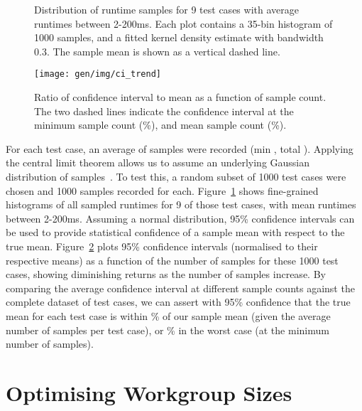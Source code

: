 \begin{figure}

\caption{%
  Distribution of runtime samples for 9 test cases with average
  runtimes between 2-200ms. Each plot contains a 35-bin histogram of
  1000 samples, and a fitted kernel density estimate with bandwidth
  0.3. The sample mean is shown as a vertical dashed line.%
}
\label{fig:runtime-histograms}
\end{figure}


\begin{figure}
\centering
\texttt{[image: gen/img/ci\_trend]}
\caption{%
  Ratio of confidence interval to mean as a function of sample
  count. The two dashed lines indicate the confidence interval at the
  minimum sample count (\%), and mean sample count
  (\%).%
}
\label{fig:ci-trends}
\end{figure}


For each test case, an average of  samples
were recorded (min , total
). Applying the central limit theorem allows us
to assume an underlying Gaussian distribution of
samples~\cite{Georges2007}. To test this, a random subset of 1000 test
cases were chosen and 1000 samples recorded for
each. Figure~\ref{fig:runtime-histograms} shows fine-grained
histograms of all sampled runtimes for 9 of those test cases, with
mean runtimes between 2-200ms. Assuming a normal distribution, 95\%
confidence intervals can be used to provide statistical confidence of
a sample mean with respect to the true
mean. Figure~\ref{fig:ci-trends} plots 95\% confidence intervals
(normalised to their respective means) as a function of the number of
samples for these 1000 test cases, showing diminishing returns as the
number of samples increase. By comparing the average confidence
interval at different sample counts against the complete dataset of
 test cases, we can assert with 95\%
confidence that the true mean for each test case is within
\% of our sample mean (given the average number of
samples per test case), or \% in the worst case (at
the minimum number of samples). 


\section{Optimising Workgroup Sizes}

